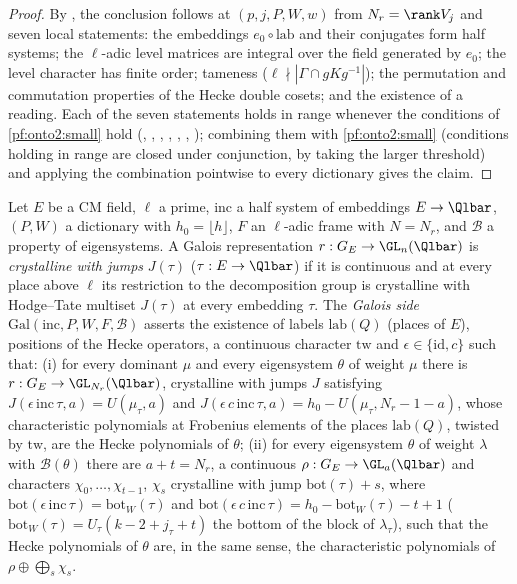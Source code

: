 \begin{proof}
By , the conclusion follows at $(p,j,P,W,w)$ from $N_r=\rank V_j$ and seven local statements:
the embeddings $e_0\circ\mathrm{lab}$ and their conjugates form half systems; the $\ell$-adic level matrices are integral over the field
generated by $e_0$; the level character has finite order; tameness ($\ell\nmid|\Gamma\cap gKg^{-1}|$); the permutation and commutation
properties of the Hecke double cosets; and the existence of a reading. Each of the seven statements holds in range whenever the
conditions of \cref{pf:onto2:small} hold (,
, ,
, ,
, ); combining them with
\cref{pf:onto2:small} (conditions holding in range are closed under conjunction, by taking the larger threshold) and applying the
combination pointwise to every dictionary gives the claim.
\end{proof}

\begin{definition}\label{pf:onto2:galside}
Let $E$ be a CM field, $\ell$ a prime, $\mathrm{inc}$ a half system of embeddings $E\to\Qlbar$, $(P,W)$ a dictionary with
$h_0=\lfloor h\rfloor$, $F$ an $\ell$-adic frame with $N=N_r$, and $\mathcal B$ a property of eigensystems. A Galois representation
$r:G_E\to\GL_n(\Qlbar)$ is \emph{crystalline with jumps} $J(\tau)$ ($\tau:E\to\Qlbar$) if it is continuous and at every place above
$\ell$ its restriction to the decomposition group is crystalline with Hodge--Tate multiset $J(\tau)$ at every embedding $\tau$.
The \emph{Galois side} $\mathrm{Gal}(\mathrm{inc},P,W,F,\mathcal B)$ asserts the existence of labels $\mathrm{lab}(Q)$ (places of $E$), positions of the Hecke
operators, a continuous character $\mathrm{tw}$ and $\epsilon\in\{\mathrm{id},c\}$ such that: (i) for every dominant $\mu$ and every
eigensystem $\theta$ of weight $\mu$ there is $r:G_E\to\GL_{N_r}(\Qlbar)$, crystalline with jumps $J$ satisfying
$J(\epsilon\,\mathrm{inc}\,\tau,a)=U(\mu_\tau,a)$ and $J(\epsilon\,c\,\mathrm{inc}\,\tau,a)=h_0-U(\mu_\tau,N_r-1-a)$, whose characteristic
polynomials at Frobenius elements of the places $\mathrm{lab}(Q)$, twisted by $\mathrm{tw}$, are the Hecke polynomials of $\theta$; (ii)
for every eigensystem $\theta$ of weight $\lambda$ with $\mathcal B(\theta)$ there are $a+t=N_r$, a continuous $\rho:G_E\to\GL_a(\Qlbar)$
and characters $\chi_0,\dots,\chi_{t-1}$, $\chi_s$ crystalline with jump $\mathrm{bot}(\tau)+s$, where
$\mathrm{bot}(\epsilon\,\mathrm{inc}\,\tau)=\mathrm{bot}_W(\tau)$ and $\mathrm{bot}(\epsilon\,c\,\mathrm{inc}\,\tau)=h_0-\mathrm{bot}_W(\tau)-t+1$
($\mathrm{bot}_W(\tau)=U_\tau(k-2+j_\tau+t)$ the bottom of the block of $\lambda_\tau$), such that the Hecke polynomials of $\theta$ are, in
the same sense, the characteristic polynomials of $\rho\oplus\bigoplus_s\chi_s$.
\end{definition}

